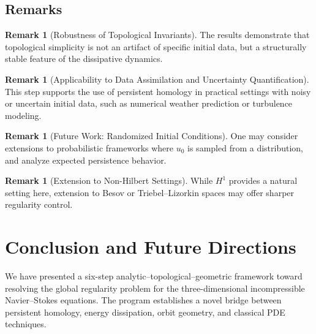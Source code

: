 \documentclass[11pt]{article}
\theoremstyle{definition}
\newtheorem{remark}[theorem]{Remark}
\begin{document}
\subsection*{Remarks}

\begin{remark}[Robustness of Topological Invariants]
The results demonstrate that topological simplicity is not an artifact of specific initial data, but a structurally stable feature of the dissipative dynamics.
\end{remark}

\begin{remark}[Applicability to Data Assimilation and Uncertainty Quantification]
This step supports the use of persistent homology in practical settings with noisy or uncertain initial data, such as numerical weather prediction or turbulence modeling.
\end{remark}

\begin{remark}[Future Work: Randomized Initial Conditions]
One may consider extensions to probabilistic frameworks where $u_0$ is sampled from a distribution, and analyze expected persistence behavior.
\end{remark}

\begin{remark}[Extension to Non-Hilbert Settings]
While $H^1$ provides a natural setting here, extension to Besov or Triebel–Lizorkin spaces may offer sharper regularity control.
\end{remark}


\section{Conclusion and Future Directions}
\label{sec:conclusion}

We have presented a six-step analytic–topological–geometric framework toward resolving the global regularity problem for the three-dimensional incompressible Navier--Stokes equations. The program establishes a novel bridge between persistent homology, energy dissipation, orbit geometry, and classical PDE techniques.
\end{document}
